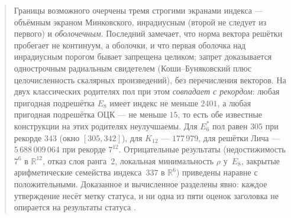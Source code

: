 \documentclass[11pt]{article}
\theoremstyle{definition}
\theoremstyle{remark}
\newcommand{\R}{\mathbb{R}}
\newcommand{\cyrbadge}[1]{{\fontencoding{T2A}\selectfont #1}}
\newcommand{\stN}{\textcolor{BurntOrange}{\textbf{\cyrbadge{[Ч]}}}}     %
\begin{document}
\begin{abstract}
Границы возможного очерчены тремя строгими экранами индекса --- объёмным
экраном Минковского, инрадиусным (второй не следует из первого) и
\emph{оболочечным}. Последний замечает, что норма вектора решётки пробегает не
континуум, а оболочки, и что первая оболочка над инрадиусным порогом бывает
запрещена целиком; запрет доказывается однострочным радиальным свидетелем
(Коши--Буняковский плюс целочисленность скалярных произведений), без
перечисления векторов. На двух классических родителях пол при этом
\emph{совпадает с рекордом}: любая пригодная подрешётка $E_8$ имеет индекс не
меньше $2401$, а любая пригодная подрешётка ОЦК --- не меньше $15$, то есть обе
известные конструкции на этих родителях неулучшаемы. Для $E_6^*$ пол равен
$305$ при рекорде $343$ (окно $[305,342]$), для $K_{12}$ --- $177\,979$, для
решётки Лича --- $5\,688\,009\,064$ при рекорде $7^{12}$.
Отрицательные результаты (недостижимость $7^6$ в $\R^{12}$, отказ слоя ранга~2,
локальная минимальность $\rho$ у~$E_8$, закрытые арифметические семейства
индекса~$337$ в $\R^6$) приведены наравне с положительными.
Доказанное и вычисленное разделены явно: каждое утверждение несёт метку
статуса, и ни одна из пяти оценок заголовка не опирается на результаты
статуса \stN.
\end{abstract}
\end{document}
